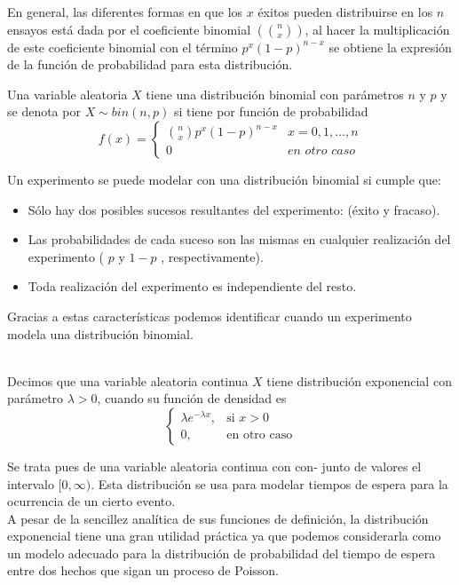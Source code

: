 En general, las diferentes formas en que los $x$ éxitos pueden distribuirse en los $n$ ensayos está dada por el coeficiente binomial $(n\choose x)$, al hacer la multiplicación de este coeficiente binomial con el término $p^x(1-p)^{n-x}$ se obtiene la expresión de la función de probabilidad para esta distribución.
\begin{Def}
    Una variable aleatoria $X$ tiene una distribución binomial con parámetros $n$ y $p$ y se denota por $X\sim bin(n,p)$ si tiene por función de probabilidad
    $$f(x)=
    \begin{cases}
        {n \choose x} p^x(1-p)^{n-x}& x=0,1,\ldots,n\\0 & \textit{en otro caso}
    \end{cases}$$
\end{Def}
Un experimento se puede modelar con una distribución binomial si cumple que:
\begin{itemize}
    \item Sólo hay dos posibles sucesos resultantes del experimento:
    (éxito y fracaso).
    \item Las probabilidades de cada suceso son las mismas en cualquier realización del experimento ( $p$ y $1-p$ , respectivamente).
    \item Toda realización del experimento es independiente del resto.
\end{itemize}
Gracias a estas características podemos identificar cuando un experimento modela una distribución binomial.\\\\
\begin{Def}
    Decimos que una variable aleatoria continua $X$ tiene distribución exponencial con parámetro $\lambda>0$, cuando su función de densidad es
    $$\begin{cases}
        \lambda e^{-\lambda x}, & \mbox{si $x>0$}\\
        0, & \mbox{en otro caso}
    \end{cases}
    $$
\end{Def}
Se trata pues de una variable aleatoria continua con con-
junto de valores el intervalo $[0,\infty)$. Esta distribución se usa para modelar tiempos de espera para la ocurrencia de un cierto evento.\\
A pesar de la sencillez analítica de sus funciones de definición, la distribución exponencial tiene una gran utilidad práctica ya que podemos considerarla como un modelo adecuado para la distribución de probabilidad del tiempo de espera entre dos hechos que sigan un proceso de Poisson.\\
